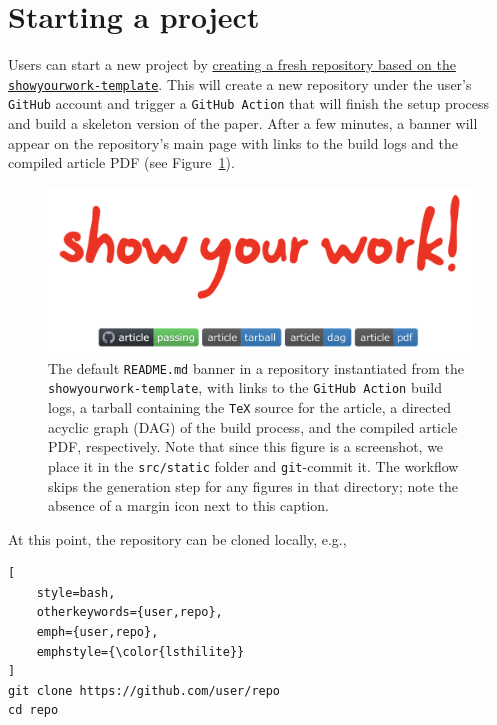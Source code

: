 \documentclass[twocolumn]{aastex631}
\begin{document}
\section{Starting a project}
\label{sec:start}
%
Users can start a new project by \href{https://github.com/rodluger/showyourwork-template/generate}{creating a fresh repository based on the \texttt{showyourwork-template}}.
This will create a new repository under the user's \texttt{GitHub} account and trigger a \texttt{GitHub Action} that will finish the setup process and build a skeleton version of the paper.
After a few minutes, a banner will appear on the repository's main page with links to the build logs and the compiled article PDF (see Figure~\ref{fig:banner}).
%
\begin{figure}[th!]
    \begin{centering}
        \includegraphics[width=\linewidth]{static/banner.png}
        \caption{
            The default \texttt{README.md} banner in a repository instantiated from the \texttt{showyourwork-template}, with links to the \texttt{GitHub Action} build logs, a tarball containing the \texttt{TeX} source for the article, a directed acyclic graph (DAG) of the build process, and the compiled article PDF, respectively.
            Note that since this figure is a screenshot, we place it in the \texttt{src/static} folder and \texttt{git}-commit it.
            The workflow skips the generation step for any figures in that directory; note the absence of a margin icon next to this caption.
        }
        \label{fig:banner}
    \end{centering}
\end{figure}
%
At this point, the repository can be cloned locally, e.g.,\\

\noindent\begin{minipage}{\linewidth}
\begin{lstlisting}[
    style=bash,
    otherkeywords={user,repo},
    emph={user,repo},
    emphstyle={\color{lsthilite}}
]
git clone https://github.com/user/repo
cd repo
\end{lstlisting}
\end{minipage}
\end{document}
